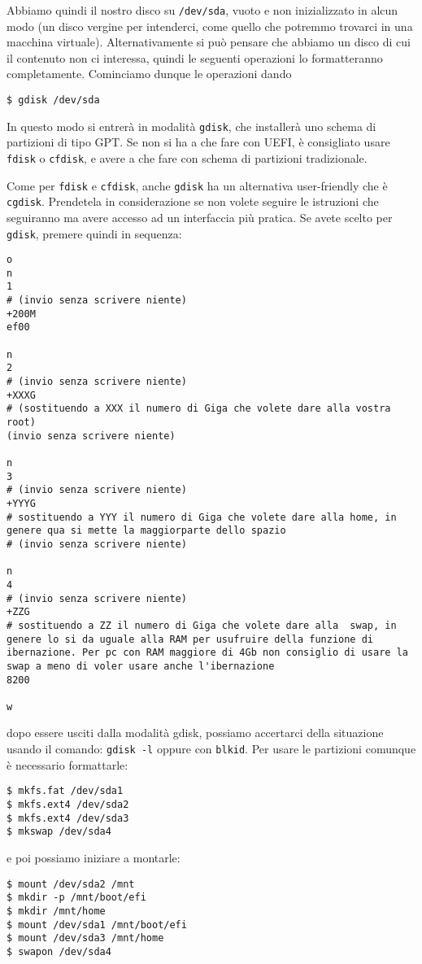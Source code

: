 \documentclass[twoside,italian]{book}
\newcommand{\code}[1]{\texttt{#1}}
\begin{document}
    Abbiamo quindi il nostro disco su \code{/dev/sda}, vuoto e non inizializzato in alcun modo (un disco vergine per intenderci, come quello che potremmo trovarci in una macchina virtuale). Alternativamente si può pensare che abbiamo un disco  di cui il contenuto non ci interessa, quindi le seguenti operazioni lo formatteranno completamente. Cominciamo dunque le operazioni dando 
    \begin{lstlisting}
$ gdisk /dev/sda
    \end{lstlisting}
    In questo modo si entrerà in modalità \code{gdisk}, che installerà uno schema di partizioni di tipo \ac{GPT}. Se non si ha a che fare con UEFI, è consigliato usare \code{fdisk} o \code{cfdisk}, e avere a che fare con schema di partizioni tradizionale.
    
    Come per \code{fdisk} e \code{cfdisk}, anche \code{gdisk} ha un alternativa user-friendly che è \code{cgdisk}. Prendetela in considerazione se non volete seguire le istruzioni che seguiranno ma avere accesso ad un interfaccia più pratica.
    Se avete scelto per \code{gdisk}, premere quindi in sequenza:
\begin{lstlisting}
o
n
1
# (invio senza scrivere niente)
+200M
ef00

n
2
# (invio senza scrivere niente)
+XXXG
# (sostituendo a XXX il numero di Giga che volete dare alla vostra root)
(invio senza scrivere niente)

n
3
# (invio senza scrivere niente)
+YYYG
# sostituendo a YYY il numero di Giga che volete dare alla home, in genere qua si mette la maggiorparte dello spazio
# (invio senza scrivere niente)

n
4
# (invio senza scrivere niente)
+ZZG
# sostituendo a ZZ il numero di Giga che volete dare alla  swap, in genere lo si da uguale alla RAM per usufruire della funzione di ibernazione. Per pc con RAM maggiore di 4Gb non consiglio di usare la swap a meno di voler usare anche l'ibernazione
8200

w
\end{lstlisting}
    dopo essere usciti dalla modalità gdisk, possiamo accertarci della situazione usando il comando: \code{gdisk -l} oppure con \code{blkid}.
    Per usare le partizioni comunque è necessario formattarle:
\begin{lstlisting}
$ mkfs.fat /dev/sda1
$ mkfs.ext4 /dev/sda2
$ mkfs.ext4 /dev/sda3
$ mkswap /dev/sda4
\end{lstlisting}
    e poi possiamo iniziare a montarle:
\begin{lstlisting}
$ mount /dev/sda2 /mnt
$ mkdir -p /mnt/boot/efi
$ mkdir /mnt/home
$ mount /dev/sda1 /mnt/boot/efi
$ mount /dev/sda3 /mnt/home
$ swapon /dev/sda4
\end{lstlisting}
\end{document}
